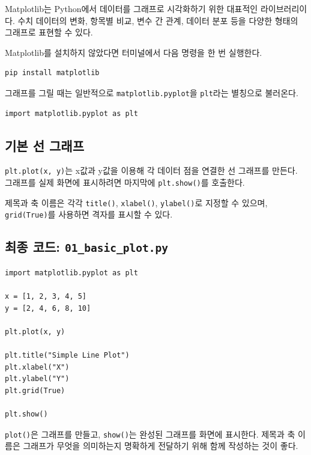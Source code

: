 \documentclass[11pt,a4paper]{article}
\begin{document}
Matplotlib는 Python에서 데이터를 그래프로 시각화하기 위한 대표적인 라이브러리이다. 수치 데이터의 변화, 항목별 비교, 변수 간 관계, 데이터 분포 등을 다양한 형태의 그래프로 표현할 수 있다.

Matplotlib를 설치하지 않았다면 터미널에서 다음 명령을 한 번 실행한다.

\begin{verbatim}
pip install matplotlib
\end{verbatim}

그래프를 그릴 때는 일반적으로 \texttt{matplotlib.pyplot}을 \texttt{plt}라는 별칭으로 불러온다.

\begin{lstlisting}
import matplotlib.pyplot as plt
\end{lstlisting}

\subsection{기본 선 그래프}

\texttt{plt.plot(x, y)}는 x값과 y값을 이용해 각 데이터 점을 연결한 선 그래프를 만든다. 그래프를 실제 화면에 표시하려면 마지막에 \texttt{plt.show()}를 호출한다.

제목과 축 이름은 각각 \texttt{title()}, \texttt{xlabel()}, \texttt{ylabel()}로 지정할 수 있으며, \texttt{grid(True)}를 사용하면 격자를 표시할 수 있다.

\subsection{최종 코드: \texttt{01\_basic\_plot.py}}

\begin{lstlisting}
import matplotlib.pyplot as plt

x = [1, 2, 3, 4, 5]
y = [2, 4, 6, 8, 10]

plt.plot(x, y)

plt.title("Simple Line Plot")
plt.xlabel("X")
plt.ylabel("Y")
plt.grid(True)

plt.show()
\end{lstlisting}

\begin{importantbox}
\texttt{plot()}은 그래프를 만들고, \texttt{show()}는 완성된 그래프를 화면에 표시한다. 제목과 축 이름은 그래프가 무엇을 의미하는지 명확하게 전달하기 위해 함께 작성하는 것이 좋다.
\end{importantbox}

\end{document}

